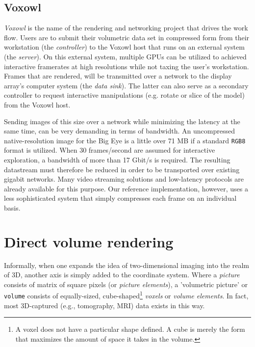\subsection{Voxowl}
\emph{Voxowl} is the name of the rendering and networking project that drives the work flow. Users are to submit their volumetric data set in compressed form from their workstation (the \emph{controller}) to the Voxowl host that runs on an external system (the \emph{server}). On this external system, multiple GPUs can be utilized to achieved interactive framerates at high resolutions while not taxing the user's workstation. Frames that are rendered, will be transmitted over a network to the display array's computer system (the \emph{data sink}). The latter can also serve as a secondary controller to request interactive manipulations (e.g. rotate or slice of the model) from the Voxowl host.

Sending images of this size over a network while minimizing the latency at the same time, can be very demanding in terms of bandwidth. An uncompressed native-resolution image for the Big Eye is a little over 71 MB if a standard \texttt{RGB8} format is utilized. When 30 frames/second are assumed for interactive exploration, a bandwidth of more than 17 Gbit/s is required. The resulting datastream must therefore be reduced in order to be transported over existing gigabit networks. Many video streaming solutions and low-latency protocols are already available for this purpose. Our reference implementation, however, uses a less sophisticated system that simply compresses each frame on an individual basis.
%
%
\section{Direct volume rendering}
%
Informally, when one expands the idea of two-dimensional imaging into the realm of 3D, another axis is simply added to the coordinate system. Where a \textit{picture} consists of matrix of square pixels (or \textit{picture elements}), a 'volumetric picture' or \texttt{volume} consists of equally-sized, cube-shaped\footnote{A voxel does not have a particular shape defined. A cube is merely the form that maximizes the amount of space it takes in the volume.} \textit{voxels} or \textit{volume elements}. In fact, most 3D-captured (e.g., tomography, MRI) data exists in this way.

